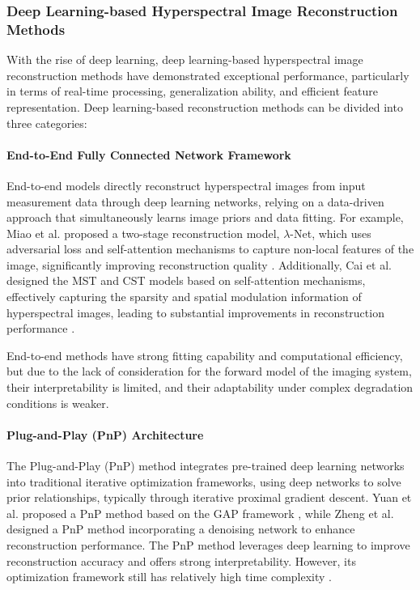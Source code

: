 \documentclass[preprint,review,12pt]{elsarticle}
\begin{document}
\subsubsection{Deep Learning-based Hyperspectral Image Reconstruction Methods}

With the rise of deep learning, deep learning-based hyperspectral image reconstruction methods have demonstrated exceptional performance, particularly in terms of real-time processing, generalization ability, and efficient feature representation. Deep learning-based reconstruction methods can be divided into three categories:

\paragraph{End-to-End Fully Connected Network Framework}

End-to-end models directly reconstruct hyperspectral images from input measurement data through deep learning networks, relying on a data-driven approach that simultaneously learns image priors and data fitting. For example, Miao et al. proposed a two-stage reconstruction model, $\lambda$-Net, which uses adversarial loss and self-attention mechanisms to capture non-local features of the image, significantly improving reconstruction quality \cite{miao2019}. Additionally, Cai et al. designed the MST and CST models based on self-attention mechanisms, effectively capturing the sparsity and spatial modulation information of hyperspectral images, leading to substantial improvements in reconstruction performance \cite{cai2022}.

End-to-end methods have strong fitting capability and computational efficiency, but due to the lack of consideration for the forward model of the imaging system, their interpretability is limited, and their adaptability under complex degradation conditions is weaker.

\paragraph{Plug-and-Play (PnP) Architecture}

The Plug-and-Play (PnP) method integrates pre-trained deep learning networks into traditional iterative optimization frameworks, using deep networks to solve prior relationships, typically through iterative proximal gradient descent. Yuan et al. proposed a PnP method based on the GAP framework \cite{yuan2020}, while Zheng et al. designed a PnP method incorporating a denoising network to enhance reconstruction performance. The PnP method leverages deep learning to improve reconstruction accuracy and offers strong interpretability. However, its optimization framework still has relatively high time complexity \cite{zheng2023}.
\end{document}
